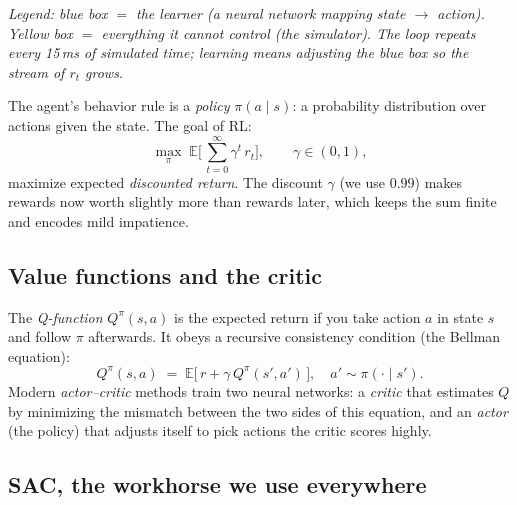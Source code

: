 \documentclass[11pt,a4paper]{article}
\begin{document}
\begin{center}

{\scriptsize\emph{Legend: blue box $=$ the learner (a neural network mapping
state $\to$ action). Yellow box $=$ everything it cannot control (the
simulator). The loop repeats every 15\,ms of simulated time; learning means
adjusting the blue box so the stream of $r_t$ grows.}}
\end{center} The
agent's behavior rule is a \emph{policy} $\pi(a \mid s)$: a probability
distribution over actions given the state. The goal of RL:
\[
\max_\pi \; \mathbb{E}\Big[\, \textstyle\sum_{t=0}^{\infty} \gamma^t\, r_t \Big],
\qquad \gamma \in (0,1),
\]
maximize expected \emph{discounted return}. The discount $\gamma$ (we use $0.99$)
makes rewards now worth slightly more than rewards later, which keeps the sum
finite and encodes mild impatience.

\subsection{Value functions and the critic}

The \emph{Q-function} $Q^\pi(s,a)$ is the expected return if you take action $a$
in state $s$ and follow $\pi$ afterwards. It obeys a recursive consistency
condition (the Bellman equation):
\[
Q^\pi(s,a) \;=\; \mathbb{E}\big[\, r + \gamma\, Q^\pi(s', a') \,\big],
\quad a' \sim \pi(\cdot \mid s').
\]
Modern \emph{actor--critic} methods train two neural networks: a \emph{critic}
that estimates $Q$ by minimizing the mismatch between the two sides of this
equation, and an \emph{actor} (the policy) that adjusts itself to pick actions the
critic scores highly.

\subsection{SAC, the workhorse we use everywhere}
\end{document}
